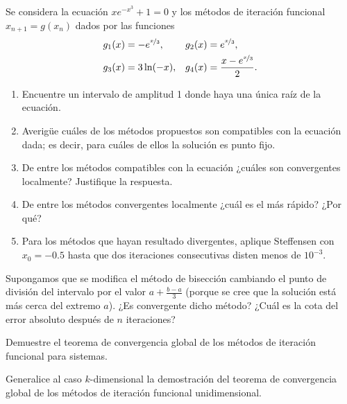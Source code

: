 \begin{ejercicio}\label{ej:1.1.13}
    Se considera la ecuación $xe^{-x^3} + 1 = 0$ y los métodos de iteración funcional $x_{n+1} = g(x_n)$ dados por las funciones
    \begin{align*}
        g_1(x) &= -e^{\nicefrac{x}{3}}, & g_2(x) &= e^{\nicefrac{x}{3}}, \\
        g_3(x) &= 3\ln(-x), & g_4(x) &= \dfrac{x-e^{\nicefrac{x}{3}}}{2}.
    \end{align*}
    \begin{enumerate}
        \item Encuentre un intervalo de amplitud 1 donde haya una única raíz de la ecuación.
        \item Averigüe cuáles de los métodos propuestos son compatibles con la ecuación dada; es decir, para cuáles de ellos la solución es punto fijo.
        \item De entre los métodos compatibles con la ecuación ¿cuáles son convergentes localmente? Justifique la respuesta.
        \item De entre los métodos convergentes localmente ¿cuál es el más rápido? ¿Por qué?
        \item Para los métodos que hayan resultado divergentes, aplique Steffensen con $x_0 = -0.5$ hasta que dos iteraciones consecutivas disten menos de $10^{-3}$.
    \end{enumerate}
\end{ejercicio}


\begin{ejercicio}\label{ej:1.1.14}
    Supongamos que se modifica el método de bisección cambiando el punto de división del intervalo por el valor $a + \frac{b-a}{3}$ (porque se cree que la solución está más cerca del extremo $a$). ¿Es convergente dicho método? ¿Cuál es la cota del error absoluto después de $n$ iteraciones?
\end{ejercicio}

\begin{ejercicio}\label{ej:1.1.15}
    Demuestre el teorema de convergencia global de los métodos de iteración funcional para sistemas.
    \begin{observacion}
        Generalice al caso $k$-dimensional la demostración del teorema de convergencia global de los métodos de iteración funcional unidimensional.
    \end{observacion}
\end{ejercicio}

